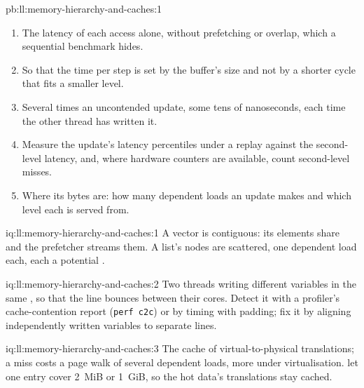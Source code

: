 \begin{solution}{pb:ll:memory-hierarchy-and-caches:1}
\begin{enumerate}
structure when an update reads all fields of one level.
\item The latency of each access alone, without prefetching or overlap, which a sequential benchmark hides.
\item So that the time per step is set by the buffer's size and not by a shorter cycle that fits a smaller level.
\item Several times an uncontended update, some tens of nanoseconds, each time the other thread has written it.
\item Measure the update's latency percentiles under a replay against the second-level latency, and, where hardware
counters are available, count second-level misses.
\item Where its bytes are: how many dependent loads an update makes and which level each is served from.
\end{enumerate}
\end{solution}

\begin{solution}{iq:ll:memory-hierarchy-and-caches:1}
A vector is contiguous: its elements share  and the prefetcher streams them. A list's nodes are scattered, one
dependent load each, each a potential .
\end{solution}

\begin{solution}{iq:ll:memory-hierarchy-and-caches:2}
Two threads writing different variables in the same , so that the line bounces between their cores. Detect it
with a profiler's cache-contention report (\texttt{perf c2c}) or by timing with padding; fix it by aligning
independently written variables to separate lines.
\end{solution}

\begin{solution}{iq:ll:memory-hierarchy-and-caches:3}
The cache of virtual-to-physical translations; a miss costs a page walk of several dependent loads, more under
virtualisation.  let one entry cover 2~MiB or 1~GiB, so the hot data's translations stay cached.
\end{solution}

